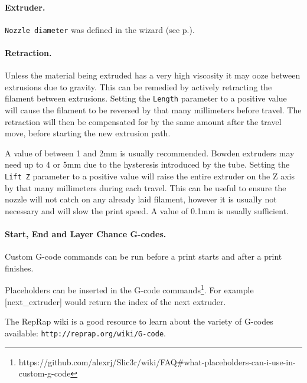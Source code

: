 \paragraph{Extruder.} %
\label{par:extruder}
\texttt{Nozzle diameter} was defined in the wizard (see p.\pageref{sub:3_nozzle_diameter}).

\paragraph{Retraction.} %
\label{par:retraction}
Unless the material being extruded has a very high viscosity it may ooze between extrusions due to gravity.  This can be remedied by actively retracting the filament between extrusions.  Setting the \texttt{Length} parameter to a positive value will cause the filament to be reversed by that many millimeters before travel.  The retraction will then be compensated for by the same amount after the travel move, before starting the new extrusion path.

A value of between 1 and 2mm is usually recommended. Bowden extruders may need up to 4 or 5mm due to the hysteresis introduced by the tube.
Setting the \texttt{Lift Z} parameter to a positive value will raise the entire extruder on the Z axis by that many millimeters during each travel.  This can be useful to ensure the nozzle will not catch on any already laid filament, however it is usually not necessary and will slow the print speed.  A value of 0.1mm is usually sufficient.

\paragraph{Start, End and Layer Chance G-codes.} %
\label{par:start_end_g_code}
Custom G-code commands can be run before a print starts and after a print finishes.

Placeholders can be inserted in the G-code commands\footnote{https://github.com/alexrj/Slic3r/wiki/FAQ\#what-placeholders-can-i-use-in-custom-g-code}.  For example [next\_extruder] would return the index of the next extruder.

The RepRap wiki is a good resource to learn about the variety of G-codes available: \texttt{http://reprap.org/wiki/G-code}.

